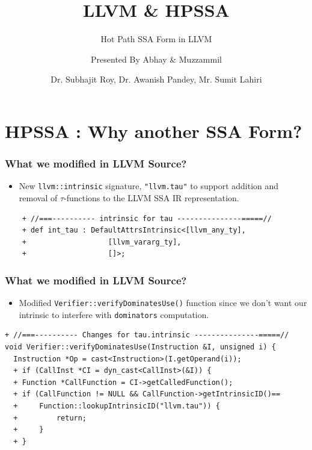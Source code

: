 \documentclass{beamer}
\title[\url{https://google.com}] %
{LLVM \& HPSSA}
\subtitle{Hot Path SSA Form in LLVM}
\author[VIP1 \& VIP2] %
{Presented By Abhay\inst{1} \& Muzzammil\inst{1}}
\institute[IDK] %
{
	\inst{1}%
	IIT Kanpur\\
	PRAISE Group
}
\date[01/03/2022] %
{Dr. Subhajit Roy, Dr. Awanish Pandey, Mr. Sumit Lahiri}
\begin{document}
\frame{\titlepage}

\footnotesize
\section{HPSSA : Why another SSA Form?}

\begin{frame}[fragile]
	\frametitle{What we modified in LLVM Source?}
	\begin{itemize}
		\item New \texttt{llvm::intrinsic} signature, \texttt{"llvm.tau"} to support addition and removal of $\tau$-functions to the LLVM SSA IR representation. 
	\end{itemize}
	\begin{verbatim}
    + //===---------- intrinsic for tau ---------------=====//
    + def int_tau : DefaultAttrsIntrinsic<[llvm_any_ty],
    +                   [llvm_vararg_ty],
    +                   []>;
	\end{verbatim}
\end{frame}
\footnotesize
\begin{frame}[fragile]
\frametitle{What we modified in LLVM Source?}
\begin{itemize}
	\item Modified \texttt{Verifier::verifyDominatesUse()} function since we don't want our intrinsic to interfere with \texttt{dominators} computation.  
\end{itemize}
\begin{verbatim}
+ //===---------- Changes for tau.intrinsic ---------------=====//
void Verifier::verifyDominatesUse(Instruction &I, unsigned i) {
  Instruction *Op = cast<Instruction>(I.getOperand(i));
  +	if (CallInst *CI = dyn_cast<CallInst>(&I)) {
  +	Function *CallFunction = CI->getCalledFunction();
  +	if (CallFunction != NULL && CallFunction->getIntrinsicID()==
  +		Function::lookupIntrinsicID("llvm.tau")) {
  +			return;
  +		}
  +	}
	\end{verbatim}
\end{frame}
\end{document}
